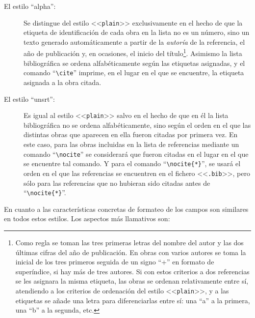 \documentclass[a4paper,11pt]{article}
\def\ltr#1-{<<\texttt{#1}>>}
\def\tpf#1-{\ltr.#1-}
\def\cmd#1-{``\texttt{\textbackslash#1}''}
\begin{document}
\begin{description}
\item[El estilo ``alpha'':] Se distingue del estilo \ltr plain- exclusivamente
  en el hecho de que la etiqueta de identificación de cada obra en la lista no
  es  un  número,  sino un  texto  generado  automáticamente  a partir  de  la
  \emph{autoría} de la  referencia, el año de publicación  y, en ocasiones, el
  inicio del título\footnote{Como regla se  toman las tres primeras letras del
    nombre del autor y las dos últimas cifras del año de publicación. En obras
    con varios autores  se toma la inicial de los tres  primeros seguida de un
    signo ``+'' en formato de superíndice,  si hay más de tres autores. Si con
    estos criterios a  dos referencias se les asignara  la misma etiqueta, las
    obras se  ordenan relativamente  entre sí, atendiendo  a los  criterios de
    ordenación del  estilo \ltr plain-, y  a las etiquetas se  añade una letra
    para  diferenciarlas entre  sí: una  ``a'' a  la primera,  una ``b''  a la
    segunda, etc.}.  Asimismo la lista bibliográfica se ordena alfabéticamente
  según las etiquetas asignadas, y el  comando \cmd cite- imprime, en el lugar
  en el que se encuentre, la etiqueta asignada a la obra citada.

\item[El estilo ``unsrt'':]  Es igual al estilo \ltr plain-  salvo en el hecho
  de que en él la lista bibliográfica no se ordena alfabéticamente, sino según
  el orden en  el que las distintas obras que aparecen  en ella fueron citadas
  por  primera vez. En  este caso,  para las  obras incluidas  en la  lista de
  referencias  mediante un  comando  \cmd nocite-  se  considerará que  fueron
  citadas en el  lugar en el que  se encuentre tal comando. Y  para el comando
  \cmd nocite\{*\}-, se usará el orden en el que las referencias se encuentren
  en el fichero \tpf bib-, pero sólo para las referencias que no hubieran sido
  citadas antes de \cmd nocite\{*\}-.

\end{description}

En  cuanto a  las  características concretas  de  formateo de  los campos  son
similares en todos estos estilos. Los aspectos más llamativos son:
\end{document}
